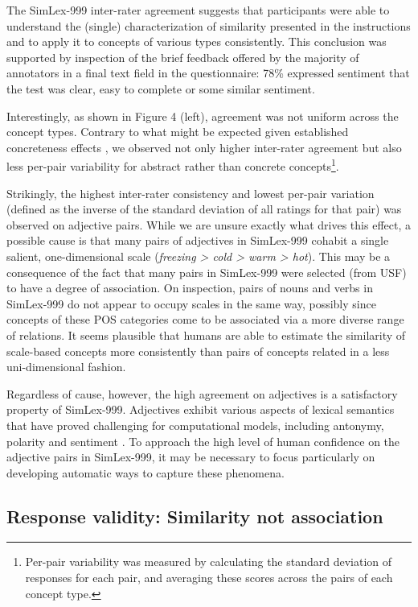 \documentclass[fullname]{clv2}
\begin{document}
The SimLex-999 inter-rater agreement suggests that participants were able to understand the (single) characterization of similarity presented in the instructions and to apply it to concepts of various types consistently. This conclusion was supported by inspection of the brief feedback offered by the majority of annotators in a final text field in the questionnaire: 78\% expressed sentiment that the test was clear, easy to complete or some similar sentiment.

Interestingly, as shown in Figure 4 (left), agreement was not uniform across the concept types. Contrary to what might be expected given established concreteness effects \cite{paivio1991dual}, we observed not only higher inter-rater agreement but also less per-pair variability for abstract rather than concrete concepts\footnote{Per-pair variability was measured by calculating the standard deviation of responses for each pair, and averaging these scores across the pairs of each concept type.}. 

Strikingly, the highest inter-rater consistency and lowest per-pair variation (defined as the inverse of the standard deviation of all ratings for that pair) was observed on adjective pairs. While we are unsure exactly what drives this effect, a possible cause is that many pairs of adjectives in SimLex-999 cohabit a single salient, one-dimensional scale (\emph{freezing > cold > warm > hot}). This may be a consequence of the fact that many pairs in SimLex-999 were selected (from USF) to have a degree of association. On inspection, pairs of nouns and verbs in SimLex-999 do not appear to occupy scales in the same way, possibly since concepts of these POS categories come to be associated via a more diverse range of relations. It seems plausible that humans are able to estimate the similarity of scale-based concepts more consistently than pairs of concepts related in a less uni-dimensional fashion. 

Regardless of cause, however, the high agreement on adjectives is a satisfactory property of SimLex-999. Adjectives exhibit various aspects of lexical semantics that have proved challenging for computational models, including antonymy, polarity \cite{williams2009predicting} and sentiment \cite{wiebe2000learning}. To approach the high level of human confidence on the adjective pairs in SimLex-999, it may be necessary to focus particularly on developing automatic ways to capture these phenomena. 

\subsection{Response validity: Similarity not association}	
\end{document}
